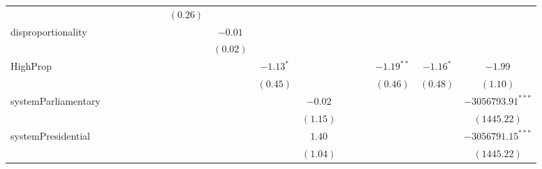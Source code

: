 \documentclass[a4paper]{article}\usepackage{graphicx, color}
\begin{document}
\begin{landscape}
\begin{table}
{{\begin{tabular}{l c c c c c c c c c c c c c c c c }
                    &               &               &               &               &               &               & $(0.26)$      &               &               &          &               &          &          &              &             &                     \\
disproportionality  &               &               &               &               &               &               &               & $-0.01$       &               &          &               &          &          &              &             &                     \\
                    &               &               &               &               &               &               &               & $(0.02)$      &               &          &               &          &          &              &             &                     \\
HighProp            &               &               &               &               &               &               &               &               & $-1.13^{*}$   &          &               &          &          & $-1.19^{**}$ & $-1.16^{*}$ & $-1.99$             \\
                    &               &               &               &               &               &               &               &               & $(0.45)$      &          &               &          &          & $(0.46)$     & $(0.48)$    & $(1.10)$            \\
systemParliamentary &               &               &               &               &               &               &               &               &               & $-0.02$  &               &          &          &              &             & $-3056793.91^{***}$ \\
                    &               &               &               &               &               &               &               &               &               & $(1.15)$ &               &          &          &              &             & $(1445.22)$         \\
systemPresidential  &               &               &               &               &               &               &               &               &               & $1.40$   &               &          &          &              &             & $-3056791.15^{***}$ \\
                    &               &               &               &               &               &               &               &               &               & $(1.04)$ &               &          &          &              &             & $(1445.22)$         \\

\end{tabular}}}
\end{table}
\end{landscape}
\end{document}
